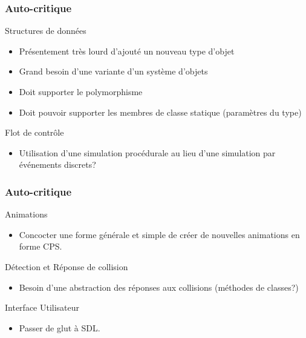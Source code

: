 \documentclass{beamer}
\newcommand{\<}[1]{\`#1}
\begin{document}
\begin{frame}
  \frametitle{Auto-critique}

  \begin{block}{Structures de données}
    \begin{itemize}
    \item Présentement très lourd d'ajouté un nouveau type d'objet
    \item Grand besoin d'une variante d'un système d'objets
    \item Doit supporter le polymorphisme
    \item Doit pouvoir supporter les membres de classe statique
      (paramètres du type)
    \end{itemize}
  \end{block}

  \begin{block}{Flot de contrôle}
    \begin{itemize}
    \item Utilisation d'une simulation procédurale au lieu d'une
      simulation par événements discrets?
    \end{itemize}
  \end{block}
\end{frame}

\begin{frame}
  \frametitle{Auto-critique}

  \begin{block}{Animations}
    \begin{itemize}
    \item Concocter une forme générale et simple de créer de nouvelles
      animations en forme CPS.
    \end{itemize}
  \end{block}

  \begin{block}{Détection et Réponse de collision}
    \begin{itemize}
    \item Besoin d'une abstraction des réponses aux collisions
      (méthodes de classes?)
    \end{itemize}
  \end{block}

  \begin{block}{Interface Utilisateur}
    \begin{itemize}
    \item Passer de glut à SDL.
    \end{itemize}
  \end{block}
\end{frame}
\end{document}
